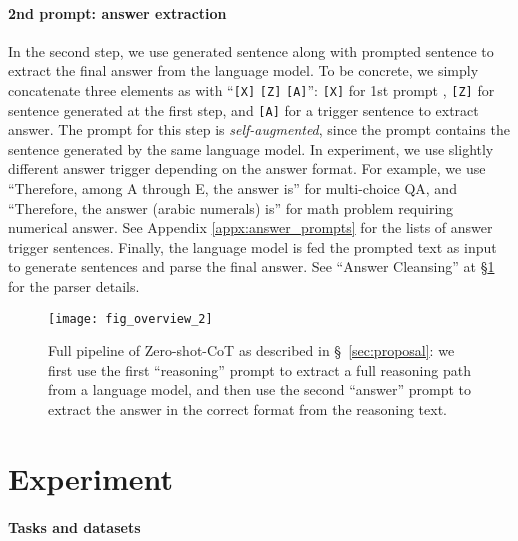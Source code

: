 \documentclass{article}
\newcommand{\ours}{Zero-shot-CoT\xspace}
\newcommand{\mysection}{\S\xspace}
\begin{document}
\paragraph{2nd prompt: answer extraction} 
In the second step, we use generated sentence  along with prompted sentence  to extract the final answer from the language model. 
To be concrete, we simply concatenate three elements as with ``\texttt{[X]} \texttt{[Z]} \texttt{[A]}'': \texttt{[X]} for 1st prompt , \texttt{[Z]} for sentence  generated at the first step, and \texttt{[A]} for a trigger sentence to extract answer. 
The prompt for this step is \textit{self-augmented}, since the prompt contains the sentence  generated by the same language model. In experiment, we use slightly different answer trigger depending on the answer format. 
For example, we use ``Therefore, among A through E, the answer is'' for multi-choice QA, and ``Therefore, the answer (arabic numerals) is'' for math problem requiring numerical answer. 
See Appendix \ref{appx:answer_prompts} for the lists of answer trigger sentences.
Finally, the language model is fed the prompted text as input to generate sentences  and parse the final answer.
See ``Answer Cleansing'' at \S \ref{sec:experiment} for the parser details.





\begin{figure}[t]
  \begin{center}
   \texttt{[image: fig\_overview\_2]}
  \end{center}
  \caption{Full pipeline of \ours as described in \mysection ~\ref{sec:proposal}: we first use the first ``reasoning'' prompt  to extract a full reasoning path from a language model, and then use the second ``answer'' prompt to extract the answer in the correct format from the reasoning text.}
  \label{fig_overview_2}
\end{figure}



\section{Experiment}
\label{sec:experiment}







\paragraph{Tasks and datasets}
\end{document}
